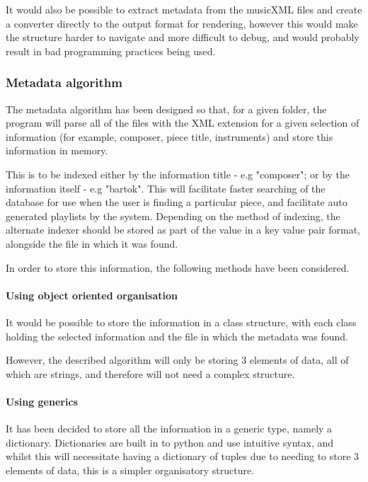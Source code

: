 It would also be possible to extract metadata from the musicXML files and create a converter directly to the output format for rendering, however this would make the structure harder to navigate and more difficult to debug, and would probably result in bad programming practices being used.



\subsubsection{Metadata algorithm}
The metadata algorithm has been designed so that, for a given folder, the program will parse all of the files with the XML extension for a given selection of information (for example, composer, piece title, instruments) and store this information in memory. 

This is to be indexed either by the information title - e.g "composer"; or by the information itself - e.g "bartok". This will facilitate faster searching of the database for use when the user is finding a particular piece, and facilitate auto generated playlists by the system. Depending on the method of indexing, the alternate indexer should be stored as part of the value in a key value pair format, alongside the file in which it was found.

In order to store this information, the following methods have been considered.

\paragraph{Using object oriented organisation}
It would be possible to store the information in a class structure, with each class holding the selected information and the file in which the metadata was found.

However, the described algorithm will only be storing 3 elements of data, all of which are strings, and therefore will not need a complex structure.

\paragraph{Using generics}
It has been decided to store all the information in a generic type, namely a dictionary. Dictionaries are built in to python and use intuitive syntax, and whilst this will necessitate having a dictionary of tuples due to needing to store 3 elements of data, this is a simpler organisatory structure.

